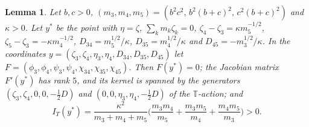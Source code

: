 \documentclass[Threeside,11pt]{article}
\newtheorem{lemma}[theorem]{Lemma}
\theoremstyle{definition}
\theoremstyle{remark}
\numberwithin{equation}{section}
\theoremstyle{remark}
\begin{document}
{\begin{lemma}\label{lem:d1-mb}
Let $b,c>0$, $(m_3,m_4,m_5)=(b^2c^2,\,b^2(b+c)^2,\,c^2(b+c)^2)$ and $\kappa>0$.  Let $y^*$ be the
point with $\eta=\zeta$, $\sum_km_k\zeta_k=0$, $\zeta_4-\zeta_3=\kappa m_5^{-1/2}$,
$\zeta_5-\zeta_3=-\kappa m_4^{-1/2}$, $D_{34}=m_5^{1/2}/\kappa$, $D_{35}=m_4^{1/2}/\kappa$ and
$D_{45}=-m_3^{1/2}/\kappa$.  In the coordinates $y=(\zeta_3,\zeta_4,\eta_3,\eta_4,D_{34},D_{35},
D_{45})$ let $F=(\phi_3,\phi_4,\psi_3,\psi_4,\chi_{34},\chi_{35},\chi_{45})$.  Then $F(y^*)=0$; the
Jacobian matrix $F'(y^*)$ has rank $5$, and its kernel is spanned by the generators
$(\zeta_3,\zeta_4,0,0,-\frac12D)$ and $(0,0,\eta_3,\eta_4,-\frac12D)$ of the $\mathbb T$-action; and
\[
  I_T(y^*)=\frac{\kappa^2}{m_3+m_4+m_5}\Big(\frac{m_3m_4}{m_5}+\frac{m_3m_5}{m_4}
  +\frac{m_4m_5}{m_3}\Big)>0 .
\]
\end{lemma}}
\end{document}
